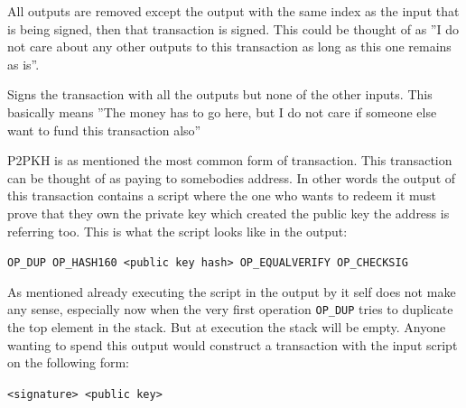 All outputs are removed except the output with the same index as the input that is being signed, then that transaction is signed.
This could be thought of as ''I do not care about any other outputs to this transaction as long as this one remains as is''.

Signs the transaction with all the outputs but none of the other inputs. This basically means ''The money has to go here, but I do not care if someone else want to fund this transaction also''


\label{p2pkh}
P2PKH is as mentioned the most common form of transaction.\cite{antonopoulos_2017} This transaction can be thought of as paying to somebodies address. In other words the output of this transaction contains a script where the one who wants to redeem it must prove that they own the private key which created the public key the address is referring too. This is what the script looks like in the output:

\texttt{OP\_DUP OP\_HASH160 <public key hash> OP\_EQUALVERIFY OP\_CHECKSIG}

As mentioned already executing the script in the output by it self does not make any sense, especially now when the very first operation \texttt{OP\_DUP} tries to duplicate the top element in the stack. But at execution the stack will be empty. Anyone wanting to spend this output would construct a transaction with the input script on the following form:

\texttt{<signature> <public key>}


